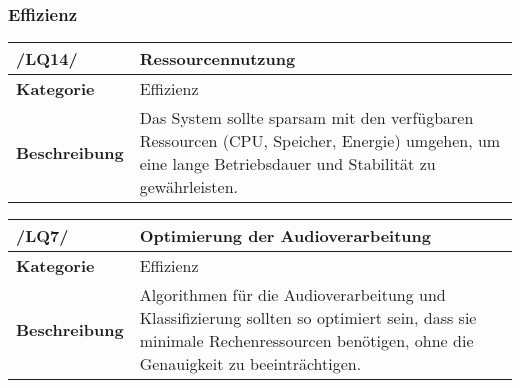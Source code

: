 \subsubsection{Effizienz}

\begin{table}[h!]
\begin{tabularx}{13cm}{|l|X|}
\hline
\textbf{/LQ14/} & \textbf{Ressourcennutzung} \\ \hline
\textbf{Kategorie} & Effizienz \\ \hline
\textbf{Beschreibung} & Das System sollte sparsam mit den verfügbaren Ressourcen (CPU, Speicher, Energie) umgehen, um eine lange Betriebsdauer und Stabilität zu gewährleisten. \\ \hline
\end{tabularx}
\end{table}

\begin{table}[h!]
	\begin{tabularx}{\textwidth}{|l|X|}
		\hline
		\textbf{/LQ7/} & \textbf{Optimierung der Audioverarbeitung} \\ \hline
		\textbf{Kategorie} & Effizienz \\ \hline
		\textbf{Beschreibung} & Algorithmen für die Audioverarbeitung und Klassifizierung sollten so optimiert sein, dass sie minimale Rechenressourcen benötigen, ohne die Genauigkeit zu beeinträchtigen. \\ \hline
	\end{tabularx}
\end{table}
